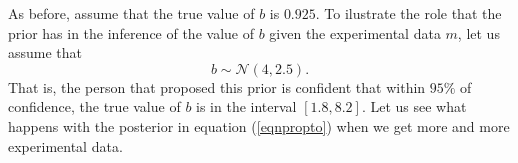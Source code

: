 \documentclass[12pt]{book}
\begin{document}
As before, assume that the true
value of $b$ is $0.925$. To ilustrate the role that the prior has in the inference of the value
of $b$ given the experimental data $m$, let us assume that 
\begin{equation*}
b\sim\mathscr{N}(4,2.5).
\end{equation*}
That is, the person that proposed this prior is confident that within $95\%$ of confidence, the true value of
$b$ is in the interval $[1.8,8.2]$. Let us see what happens with the posterior in equation (\ref{eqnpropto})
when we get more and more experimental data. 


\end{document}
